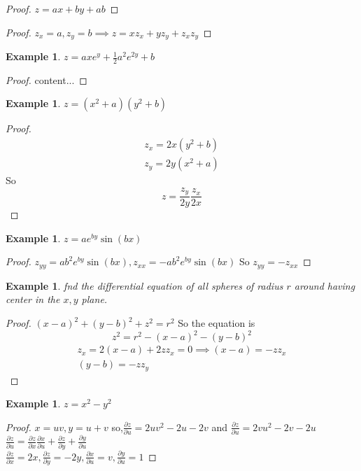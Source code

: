 \documentclass[oneside,11pt,pdftex,final]{book}%
\numberwithin{equation}{section}
\newtheorem{example}[theorem]{Example}
\numberwithin{section}{chapter}
\numberwithin{equation}{chapter}
\begin{document}
\begin{proof}
	$ z=ax+by+ab $
\end{proof}
\begin{proof}
	$ z_x=a, z_y=b \implies z=xz_x+yz_y+z_xz_y$
\end{proof}
\begin{example}
	$ z=axe^y+\frac{1}{2}a^2e^{2y}+b$
\end{example}
\begin{proof}
	content...
\end{proof}
\begin{example}
	$ z=(x^2+a) (y^2+b)$
\end{example}
\begin{proof}
	\begin{align*}
		z_x=2x(y^2+b)\\
		z_y=2y(x^2+a)
	\end{align*}
So \[ z=\frac{z_y}{2y}\frac{z_x}{2x} \]
\end{proof}

\begin{example}
	$ z=ae^{by}\sin(bx) $
\end{example}
\begin{proof}
	$ z_{yy}=ab^2e^{by} \sin(bx), z_{xx}=-ab^2e^{by}\sin(bx) $
	So $ z_{yy}=-z_{xx} $
\end{proof}

\begin{example}
	fnd the differential equation of all spheres of radius $ r $ around having center in the $ x,y $ plane.
\end{example}
\begin{proof}
	$ (x-a)^2+(y-b)^2+z^2=r^2 $
	So the equation is
	\[ z^2=r^2-(x-a)^2-(y-b)^2\]
	\begin{align*}
		z_x=2(x-a)+2zz_x=0 \implies (x-a)=-zz_x\\
		(y-b)=-zz_y
	\end{align*}
\end{proof}

\begin{example}
	$ z=x^2-y^2 $
\end{example}
\begin{proof}
	$ x=uv, y=u+v $ so,$ \frac{\partial z}{\partial u}=2uv^2-2u-2v $
	and $ \frac{\partial z}{\partial u} =2vu^2-2v-2u$
	$ \frac{\partial z}{\partial u} = \frac{\partial z}{\partial x} \frac{\partial x}{\partial u}+\frac{\partial z}{\partial y}+\frac{\partial y}{\partial u}$\\
	$ \frac{\partial z}{\partial x}=2x, \frac{\partial z}{\partial y}=-2y, \frac{\partial x}{\partial u} =v, \frac{\partial y}{\partial u}=1$
	
	
\end{proof}
\end{document}
